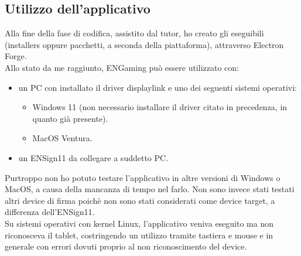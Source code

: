 \newpage
\subsection{Utilizzo dell'applicativo}
Alla fine della fase di codifica, assistito dal tutor, ho creato gli eseguibili (installers oppure pacchetti, a seconda della piattaforma), attraverso Electron Forge.\\
Allo stato da me raggiunto, ENGaming può essere utilizzato con:
\begin{itemize}
    \item un PC con installato il driver \gls{displaylink} e uno dei seguenti sistemi operativi: \begin{itemize}
    \item Windows 11 (non necessario installare il driver citato in precedenza, in quanto già presente).
    \item MacOS Ventura.
    \end{itemize}
    \item un ENSign11 da collegare a suddetto PC.
\end{itemize}
Purtroppo non ho potuto testare l'applicativo in altre versioni di Windows o MacOS, a causa della mancanza di tempo nel farlo. Non sono invece stati testati altri device di firma poichè non sono stati considerati come device target, a differenza dell'ENSign11.\\
Su sistemi operativi con kernel Linux, l'applicativo veniva eseguito ma non riconosceva il tablet, costringendo un utilizzo tramite tastiera e mouse e in generale con errori dovuti proprio al non riconoscimento del device.
\newpage
